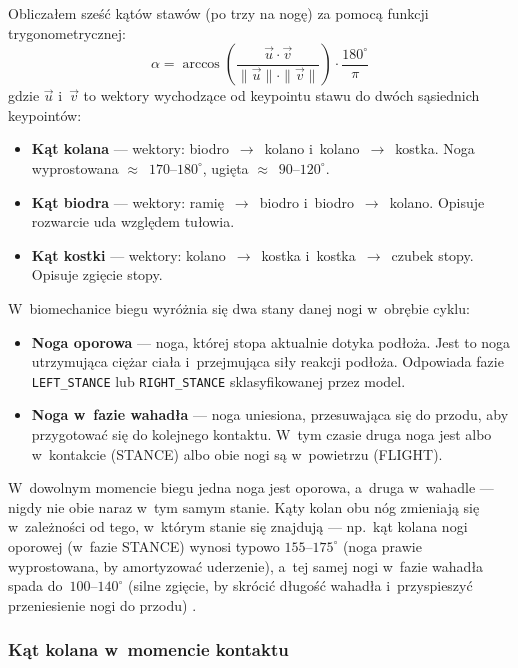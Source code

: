 Obliczałem sześć kątów stawów (po trzy na nogę) za pomocą funkcji trygonometrycznej:
\[
\alpha = \arccos\!\left(\frac{\vec{u} \cdot \vec{v}}{\|\vec{u}\| \cdot \|\vec{v}\|}\right) \cdot \frac{180^\circ}{\pi}
\]
gdzie $\vec{u}$ i~$\vec{v}$ to wektory wychodzące od keypointu stawu do dwóch sąsiednich keypointów:

\begin{itemize}
    \item \textbf{Kąt kolana} --- wektory: biodro~$\to$~kolano i~kolano~$\to$~kostka. Noga wyprostowana $\approx$~$170$--$180^\circ$, ugięta $\approx$~$90$--$120^\circ$.
    \item \textbf{Kąt biodra} --- wektory: ramię~$\to$~biodro i~biodro~$\to$~kolano. Opisuje rozwarcie uda względem tułowia.
    \item \textbf{Kąt kostki} --- wektory: kolano~$\to$~kostka i~kostka~$\to$~czubek stopy. Opisuje zgięcie stopy.
\end{itemize}

W~biomechanice biegu wyróżnia się dwa stany danej nogi w~obrębie cyklu:

\begin{itemize}
    \item \textbf{Noga oporowa} --- noga, której stopa aktualnie dotyka podłoża. Jest to noga utrzymująca ciężar ciała i~przejmująca siły reakcji podłoża. Odpowiada fazie \texttt{LEFT\_STANCE} lub \texttt{RIGHT\_STANCE} sklasyfikowanej przez model.
    \item \textbf{Noga w~fazie wahadła} --- noga uniesiona, przesuwająca się do przodu, aby przygotować się do kolejnego kontaktu. W~tym czasie druga noga jest albo w~kontakcie (STANCE) albo obie nogi są w~powietrzu (FLIGHT).
\end{itemize}

W~dowolnym momencie biegu jedna noga jest oporowa, a~druga w~wahadle --- nigdy nie obie naraz w~tym samym stanie. Kąty kolan obu nóg zmieniają się w~zależności od tego, w~którym stanie się znajdują --- np.~kąt kolana nogi oporowej (w~fazie STANCE) wynosi typowo $155$--$175^\circ$ (noga prawie wyprostowana, by amortyzować uderzenie), a~tej samej nogi w~fazie wahadła spada do~$100$--$140^\circ$ (silne zgięcie, by skrócić długość wahadła i~przyspieszyć przeniesienie nogi do przodu) \cite{novacheck1998}.

\subsubsection{Kąt kolana w~momencie kontaktu}

